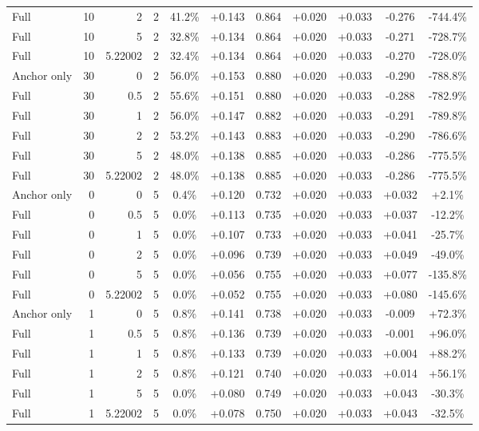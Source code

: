 \begin{table}[htbp]
\begin{tabular}{lrrrccccccc}
Full & 10 & 2 & 2 & 41.2\% & +0.143 & 0.864 & +0.020 & +0.033 & -0.276 & -744.4\% \\
Full & 10 & 5 & 2 & 32.8\% & +0.134 & 0.864 & +0.020 & +0.033 & -0.271 & -728.7\% \\
Full & 10 & 5.22002 & 2 & 32.4\% & +0.134 & 0.864 & +0.020 & +0.033 & -0.270 & -728.0\% \\
Anchor only & 30 & 0 & 2 & 56.0\% & +0.153 & 0.880 & +0.020 & +0.033 & -0.290 & -788.8\% \\
Full & 30 & 0.5 & 2 & 55.6\% & +0.151 & 0.880 & +0.020 & +0.033 & -0.288 & -782.9\% \\
Full & 30 & 1 & 2 & 56.0\% & +0.147 & 0.882 & +0.020 & +0.033 & -0.291 & -789.8\% \\
Full & 30 & 2 & 2 & 53.2\% & +0.143 & 0.883 & +0.020 & +0.033 & -0.290 & -786.6\% \\
Full & 30 & 5 & 2 & 48.0\% & +0.138 & 0.885 & +0.020 & +0.033 & -0.286 & -775.5\% \\
Full & 30 & 5.22002 & 2 & 48.0\% & +0.138 & 0.885 & +0.020 & +0.033 & -0.286 & -775.5\% \\
Anchor only & 0 & 0 & 5 & 0.4\% & +0.120 & 0.732 & +0.020 & +0.033 & +0.032 & +2.1\% \\
Full & 0 & 0.5 & 5 & 0.0\% & +0.113 & 0.735 & +0.020 & +0.033 & +0.037 & -12.2\% \\
Full & 0 & 1 & 5 & 0.0\% & +0.107 & 0.733 & +0.020 & +0.033 & +0.041 & -25.7\% \\
Full & 0 & 2 & 5 & 0.0\% & +0.096 & 0.739 & +0.020 & +0.033 & +0.049 & -49.0\% \\
Full & 0 & 5 & 5 & 0.0\% & +0.056 & 0.755 & +0.020 & +0.033 & +0.077 & -135.8\% \\
Full & 0 & 5.22002 & 5 & 0.0\% & +0.052 & 0.755 & +0.020 & +0.033 & +0.080 & -145.6\% \\
Anchor only & 1 & 0 & 5 & 0.8\% & +0.141 & 0.738 & +0.020 & +0.033 & -0.009 & +72.3\% \\
Full & 1 & 0.5 & 5 & 0.8\% & +0.136 & 0.739 & +0.020 & +0.033 & -0.001 & +96.0\% \\
Full & 1 & 1 & 5 & 0.8\% & +0.133 & 0.739 & +0.020 & +0.033 & +0.004 & +88.2\% \\
Full & 1 & 2 & 5 & 0.8\% & +0.121 & 0.740 & +0.020 & +0.033 & +0.014 & +56.1\% \\
Full & 1 & 5 & 5 & 0.0\% & +0.080 & 0.749 & +0.020 & +0.033 & +0.043 & -30.3\% \\
Full & 1 & 5.22002 & 5 & 0.0\% & +0.078 & 0.750 & +0.020 & +0.033 & +0.043 & -32.5\% \\

\end{tabular}
\end{table}
